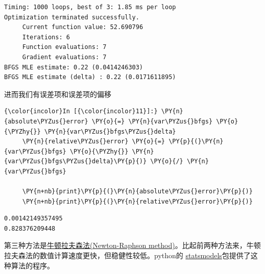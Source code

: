 \begin{Verbatim}[commandchars=\\\{\}]
Timing: 1000 loops, best of 3: 1.85 ms per loop
Optimization terminated successfully.
     Current function value: 52.690796
     Iterations: 6
     Function evaluations: 7
     Gradient evaluations: 7
BFGS MLE estimate: 0.22 (0.0414246303)
BFGS MLE estimate (delta) : 0.22 (0.0171611895)

\end{Verbatim}

进而我们有误差项和误差项的偏移

\begin{Verbatim}[commandchars=\\\{\}]
{\color{incolor}In [{\color{incolor}11}]:} \PY{n}{absolute\PYZus{}error} \PY{o}{=} \PY{n}{var\PYZus{}bfgs} \PY{o}{\PYZhy{}} \PY{n}{var\PYZus{}bfgs\PYZus{}delta}
     \PY{n}{relative\PYZus{}error} \PY{o}{=} \PY{p}{(}\PY{n}{var\PYZus{}bfgs} \PY{o}{\PYZhy{}} \PY{n}{var\PYZus{}bfgs\PYZus{}delta}\PY{p}{)} \PY{o}{/} \PY{n}{var\PYZus{}bfgs}

     \PY{n+nb}{print}\PY{p}{(}\PY{n}{absolute\PYZus{}error}\PY{p}{)}
     \PY{n+nb}{print}\PY{p}{(}\PY{n}{relative\PYZus{}error}\PY{p}{)}
\end{Verbatim}

\begin{Verbatim}[commandchars=\\\{\}]
0.00142149357495
0.828376209448

\end{Verbatim}

第三种方法是\href{https://en.wikipedia.org/wiki/Newton\%27s_method}{牛顿拉夫森法(Newton-Raphson
method)}。比起前两种方法来，牛顿拉夫森法的数值计算速度更快，但稳健性较低。python的 \href{http://www.statsmodels.org/stable/index.html}{statsmodels}包提供了这种算法的程序。

